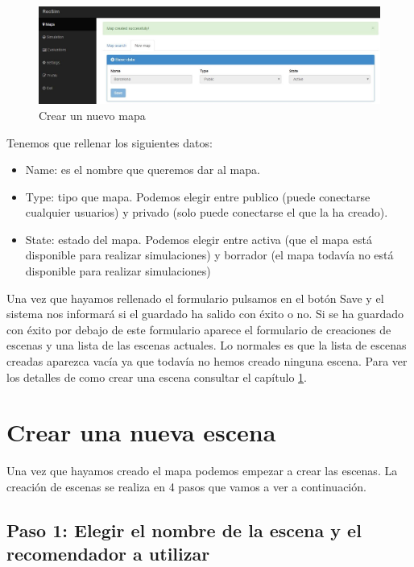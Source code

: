 \begin{figure}[H]
	\centering\includegraphics[scale=0.35]{imagenes/capitulo8/crear-un-nuevo-mapa.jpg}
	\caption{Crear un nuevo mapa}
	\label{img:AddMapa}
\end{figure}

Tenemos que rellenar los siguientes datos:

\begin{itemize}
	\item Name: es el nombre que queremos dar al mapa.
	\item Type: tipo que mapa. Podemos elegir entre publico (puede conectarse cualquier usuarios) y privado (solo puede conectarse el que la ha creado).
	\item State: estado del mapa. Podemos elegir entre activa (que el mapa está disponible para realizar simulaciones) y borrador (el mapa todavía no está disponible para realizar simulaciones)
\end{itemize}

Una vez que hayamos rellenado el formulario pulsamos en el botón Save y el sistema nos informará si el guardado ha salido con éxito o no. Si se ha guardado con éxito por debajo de este formulario aparece el formulario de creaciones de escenas y una lista de las escenas actuales. Lo normales es que la lista de escenas creadas aparezca vacía ya que todavía no hemos creado ninguna escena. Para ver los detalles de como crear una escena consultar el capítulo \ref{sec:crearEscena}.

\section{Crear una nueva escena}\label{sec:crearEscena}
Una vez que hayamos creado el mapa podemos empezar a crear las escenas. La creación de escenas se realiza en 4 pasos que vamos a ver a continuación.

\subsection{Paso 1: Elegir el nombre de la escena y el recomendador a utilizar}

